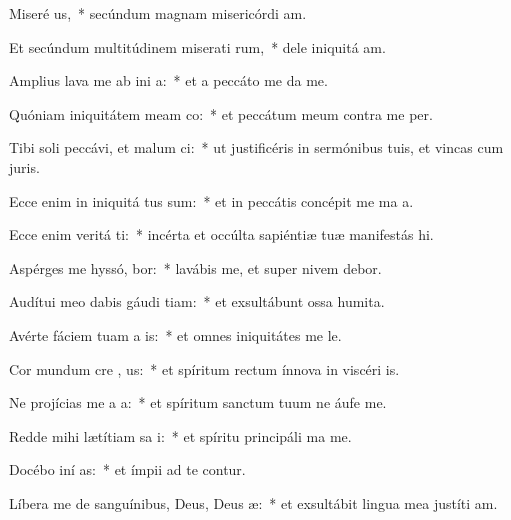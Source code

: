 \item Miseré  us,~* secúndum magnam misericórdi am.
\item Et secúndum multitúdinem miserati rum,~* dele iniquitá am.
\item Amplius lava me ab ini a:~* et a peccáto me da me.
\item Quóniam iniquitátem meam  co:~* et peccátum meum contra me  per.
\item Tibi soli peccávi, et malum   ci:~* ut justificéris in sermónibus tuis, et vincas cum juris.
\item Ecce enim in iniquitá tus sum:~* et in peccátis concépit me ma a.
\item Ecce enim veritá ti:~* incérta et occúlta sapiéntiæ tuæ manifestás hi.
\item Aspérges me hyssó,  bor:~* lavábis me, et super nivem debor.
\item Audítui meo dabis gáudi  tiam:~* et exsultábunt ossa humita.
\item Avérte fáciem tuam a  is:~* et omnes iniquitátes me le.
\item Cor mundum cre  , us:~* et spíritum rectum ínnova in viscéri is.
\item Ne projícias me a  a:~* et spíritum sanctum tuum ne áufe  me.
\item Redde mihi lætítiam sa i:~* et spíritu principáli ma me.
\item Docébo iní  as:~* et ímpii ad te contur.
\item Líbera me de sanguínibus, Deus, Deus  æ:~* et exsultábit lingua mea justíti am.
